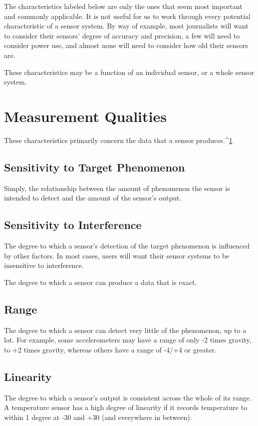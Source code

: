 The characteristics labeled below are only the ones that seem most important
and commonly applicable. It is not useful for us to work through every
potential characteristic of a sensor system. By way of example, most journalists
will want to consider their sensors' degree of accuracy and precision,
a few will need to consider power use, and almost none will need to consider
how old their sensors are.

These characteristics may be a function of an individual sensor, or a whole
sensor system.

\section{Measurement Qualities}
These characteristics primarily concern the data that a sensor produces.^{\href{#endnotes-the-characteristics-of-sensors}{1}}

\subsection{Sensitivity to Target Phenomenon}
Simply, the relationship between the amount of phenomenon the sensor is
intended to detect and the amount of the sensor's output.

\subsection{Sensitivity to Interference}
The degree to which a sensor's detection of the target phenomenon is influenced
by other factors. In most cases, users will want their sensor systems
to be insensitive to interference.

The degree to which a sensor can produce a data that is exact.

\subsection{Range}
The degree to which a sensor can detect very little of the phenomenon, up
to a lot. For example, some accelerometers may have a range of only -2 times
gravity, to +2 times gravity, whereas others have a range of -4/+4 or greater.

\subsection{Linearity}
The degree to which a sensor's output is consistent across the whole of its
range. A temperature sensor has a high degree of linearity if it records temperature
to within 1 degree at -30 and +30 (and everywhere in between).

